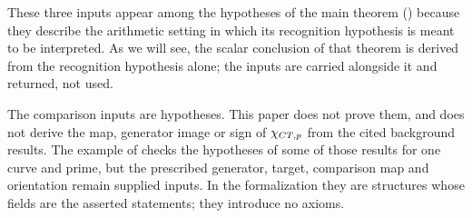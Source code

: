 These three inputs appear among the hypotheses of the main theorem
() because they describe the
arithmetic setting in which its recognition hypothesis is meant to be
interpreted.  As we will see, the scalar conclusion of that theorem is
derived from the recognition hypothesis alone; the inputs are carried
alongside it and returned, not used.

\begin{nonclaim}\label{nonclaim:closure:imports-not-derived}
The comparison inputs are hypotheses.  This paper does not prove them,
and does not derive the map, generator image or sign of $\chi_{CT,p}$ from
the cited background results.  The example of  checks
the hypotheses of some of those results for one curve and prime, but the
prescribed generator, target, comparison map and orientation remain
supplied inputs.  In the formalization they are
structures whose fields are the asserted statements; they introduce no
axioms.
\end{nonclaim}
